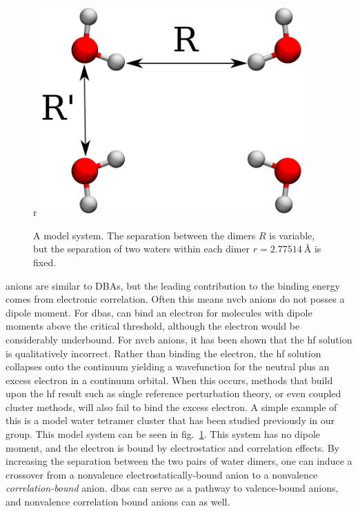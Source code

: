 \begin{figure}{r}
    \centering
	\includegraphics[width=0.9\textwidth,keepaspectratio]{Images/chapter1/h2o4_labeled.eps}
	\caption{A model  system. The separation between the dimers $R$ is variable, but the separation of two waters within each dimer $r=\SI{2.77514}{\angstrom}$ is fixed.}
	\label{fig:h2o4}
\end{figure}
 anions are similar to DBAs, but the leading contribution to the binding energy comes from electronic correlation.
Often this means \gls{nvcb} anions do not posses a dipole moment.
For \glspl{dba},  can bind an electron for molecules with dipole moments above the critical threshold, although the electron would be considerably underbound.
For \gls{nvcb} anions, it has been shown that the \gls{hf} solution is qualitatively incorrect.
Rather than binding the electron, the \gls{hf} solution collapses onto the continuum yielding a wavefunction for the neutral plus an excess electron in a continuum orbital.
When this occurs, methods that build upon the \gls{hf} result such as single reference perturbation theory, or even coupled cluster methods, will also fail to bind the excess electron.
A simple example of this is a model water tetramer cluster that has been studied previously in our group.\cite{10.1063/1.4991497}
This model system can be seen in fig.~\ref{fig:h2o4}.
This system has no dipole moment, and the electron is bound by electrostatics and correlation effects.
By increasing the separation between the two pairs of water dimers, one can induce a crossover from a nonvalence electrostatically-bound anion to a nonvalence \textit{correlation-bound} anion.
\Glspl{dba} can serve as a pathway to valence-bound anions\cite{10.1063/1.475360,10.1063/1.472993,10.1063/1.471484,10.1021/jp9728417}, and nonvalence correlation bound anions can as well.\cite{10.1021/jp408386f}

